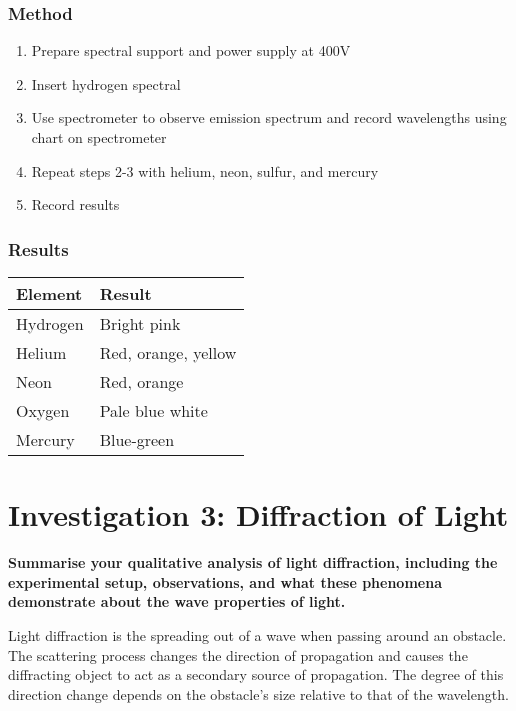 \documentclass{report}
\begin{document}
		\subsubsection{Method}
			\begin{enumerate}
				\item Prepare spectral support and power supply at 400V
				\item Insert hydrogen spectral
				\item Use spectrometer to observe emission spectrum and record wavelengths using chart on spectrometer
				\item Repeat steps 2-3 with helium, neon, sulfur, and mercury
				\item Record results
			\end{enumerate}

		\subsubsection{Results}
			\begin{table}[H]
				\centering
				\begin{tabular}{p{3cm}|p{10cm}}
					\textbf{Element}	& \textbf{Result}			\\ \hline
					Hydrogen		& Bright pink				\\
					Helium			& Red, orange, yellow			\\
					Neon			& Red, orange				\\
					Oxygen			& Pale blue white			\\
					Mercury			& Blue-green				\\
				\end{tabular}
			\end{table}

\newpage

	\section{Investigation 3: Diffraction of Light}
	
		\textbf{Summarise your qualitative analysis of light diffraction, including the experimental setup, observations, and what these phenomena demonstrate about the wave properties of light.}

			Light diffraction is the spreading out of a wave when passing around an obstacle. The scattering process changes the direction of propagation and causes the diffracting object to act as a secondary source of propagation. The degree of this direction change depends on the obstacle's size relative to that of the wavelength.
\end{document}
